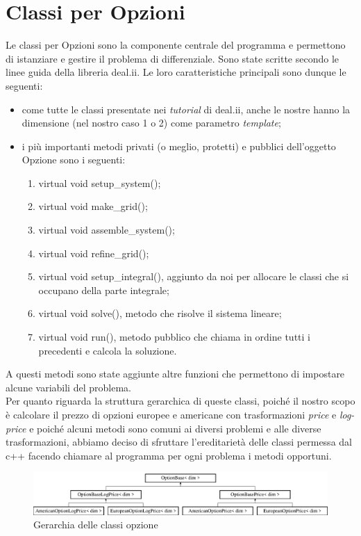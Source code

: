 \documentclass[a4paper,10pt]{report}
\theoremstyle{plain}
\theoremstyle{definition}
\theoremstyle{remark}
\begin{document}
\section{Classi per Opzioni}
Le classi per Opzioni sono la componente centrale del programma e permettono di istanziare e gestire il problema di differenziale. Sono state scritte secondo le linee guida della libreria \textsf{deal.ii}. Le loro caratteristiche principali sono dunque le seguenti:
\begin{itemize}
\item {come tutte le classi presentate nei \emph{tutorial} di \textsf{deal.ii}, anche le nostre hanno la dimensione (nel nostro caso 1 o 2) come parametro \emph{template};}
\item {i pi\`u importanti metodi privati (o meglio, protetti) e pubblici dell'oggetto Opzione sono i seguenti:}
\begin{enumerate}
\item \textsf{virtual void setup\_system()};
\item \textsf{virtual void make\_grid()};
\item \textsf{virtual void assemble\_system()};
\item \textsf{virtual void refine\_grid()};
\item \textsf{virtual void setup\_integral()}, aggiunto da noi per allocare le classi che si occupano della parte integrale;
\item \textsf{virtual void solve()}, metodo che risolve il sistema lineare;
\item \textsf{virtual void run()}, metodo pubblico che chiama in ordine tutti i precedenti e calcola la soluzione.
\end{enumerate}
\end{itemize}
A questi metodi sono state aggiunte altre funzioni che permettono di impostare alcune variabili del problema.\\Per quanto riguarda la struttura gerarchica di queste classi, poich\'e il nostro scopo \`e calcolare il prezzo di opzioni europee e americane con trasformazioni \emph{price} e \emph{log-price} e poich\'e alcuni metodi sono comuni ai diversi problemi e alle diverse trasformazioni, abbiamo deciso di sfruttare l'ereditariet\`a delle classi permessa dal c++ facendo chiamare al programma per ogni problema i metodi opportuni.
\begin{figure}[h!]
\begin{center}
\includegraphics[width=12cm]{img/classOptionBase.eps}
\caption{Gerarchia delle classi opzione}
\label{optionbase}
\end{center}
\end{figure}
\end{document}
